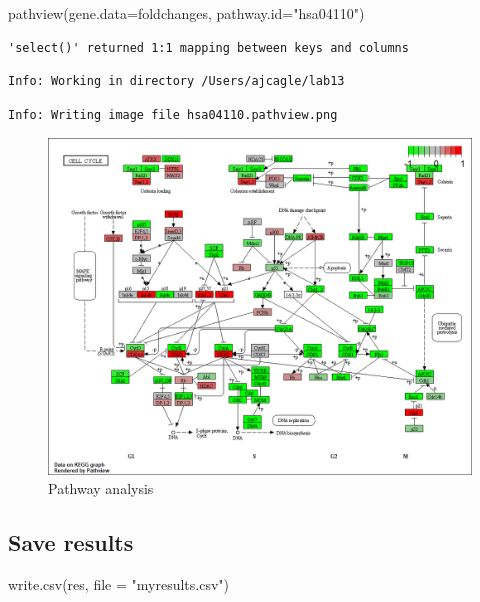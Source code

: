 \documentclass[
  letterpaper,
  DIV=11,
  numbers=noendperiod]{scrartcl}
\newenvironment{Shaded}{\begin{snugshade}}{\end{snugshade}}
\newcommand{\AttributeTok}[1]{\textcolor[rgb]{0.40,0.45,0.13}{#1}}
\newcommand{\FunctionTok}[1]{\textcolor[rgb]{0.28,0.35,0.67}{#1}}
\newcommand{\NormalTok}[1]{\textcolor[rgb]{0.00,0.23,0.31}{#1}}
\newcommand{\StringTok}[1]{\textcolor[rgb]{0.13,0.47,0.30}{#1}}
\begin{document}
\begin{Shaded}
\begin{Highlighting}[]
\FunctionTok{pathview}\NormalTok{(}\AttributeTok{gene.data=}\NormalTok{foldchanges, }\AttributeTok{pathway.id=}\StringTok{"hsa04110"}\NormalTok{)}
\end{Highlighting}
\end{Shaded}

\begin{verbatim}
'select()' returned 1:1 mapping between keys and columns
\end{verbatim}

\begin{verbatim}
Info: Working in directory /Users/ajcagle/lab13
\end{verbatim}

\begin{verbatim}
Info: Writing image file hsa04110.pathview.png
\end{verbatim}

\begin{figure}

{\centering \includegraphics{hsa04110.pathview.png}

}

\caption{Pathway analysis}

\end{figure}

\hypertarget{save-results}{%
\subsection{Save results}\label{save-results}}

\begin{Shaded}
\begin{Highlighting}[]
\FunctionTok{write.csv}\NormalTok{(res, }\AttributeTok{file =} \StringTok{"myresults.csv"}\NormalTok{)}
\end{Highlighting}
\end{Shaded}
\end{document}
